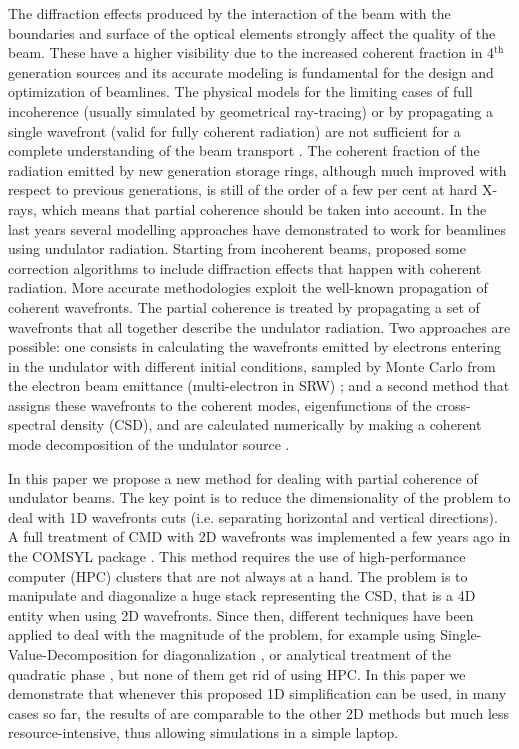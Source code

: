 \documentclass{iucr}              %
\begin{document}
The diffraction effects produced by the interaction of the beam with the boundaries and surface of the optical elements strongly affect the quality of the beam. These have a higher visibility due to the increased coherent fraction in 4$^{\text{th}}$ generation sources and its accurate modeling is fundamental for the design and optimization of beamlines. The physical models for the limiting cases of full incoherence (usually simulated by geometrical ray-tracing) or by propagating a single wavefront (valid for fully coherent radiation) are not sufficient for a complete understanding of the beam transport \cite{hierarchical}. The coherent fraction of the radiation emitted by new generation storage rings, although much improved with respect to previous generations, is still of the order of a few per cent at hard X-rays, which means that partial coherence should be taken into account. In the last years several modelling approaches have demonstrated to work for beamlines using undulator radiation. Starting from incoherent beams,  proposed some correction algorithms to include diffraction effects that happen with coherent radiation. More accurate methodologies exploit the well-known propagation of coherent wavefronts. The partial coherence is treated by propagating a set of wavefronts that all together describe the undulator radiation. Two approaches are possible: one consists in calculating the wavefronts emitted by electrons entering in the undulator with different initial conditions, sampled by Monte Carlo from the electron beam emittance (multi-electron in SRW) \cite{codeSRW_ME}; and a second method that assigns these wavefronts to the coherent modes, eigenfunctions of the cross-spectral density (CSD), and are calculated numerically by making a coherent mode decomposition of the undulator source \cite{codeCOMSYL}.  


In this paper we propose a new method for dealing with partial coherence of undulator beams. The key point is to reduce the dimensionality of the problem to deal with 1D wavefronts cuts (i.e. separating horizontal and vertical directions). A full treatment of CMD with 2D wavefronts was implemented a few years ago in the COMSYL package \cite{glass2017}. This method requires the use of high-performance computer (HPC) clusters that are not always at a hand. The problem is to manipulate and diagonalize a huge stack representing the CSD, that is a 4D entity when using 2D wavefronts. Since then, different techniques have been applied to deal with the magnitude of the problem, for example using Single-Value-Decomposition for diagonalization \cite{SVDHanXu}, or analytical treatment of the quadratic phase \cite{ChubarCMD2022}, but none of them get rid of using HPC. In this paper we demonstrate that whenever this proposed 1D simplification can be used, in many cases so far, the results of are comparable to the other 2D methods but much less resource-intensive, thus allowing simulations in a simple laptop. 
\end{document}

